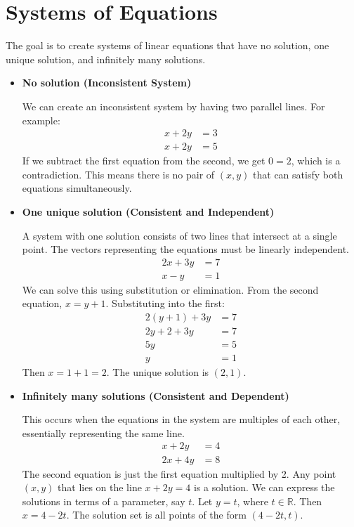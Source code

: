 \documentclass{article}
\begin{document}
\section{Systems of Equations}
    The goal is to create systems of linear equations that have no solution, one unique solution, and infinitely many solutions.
    \begin{itemize}
        \item \textbf{No solution (Inconsistent System)}
        
        We can create an inconsistent system by having two parallel lines. For example:
        \begin{align*}
            x + 2y &= 3 \\
            x + 2y &= 5
        \end{align*}
        If we subtract the first equation from the second, we get $0 = 2$, which is a contradiction. This means there is no pair of $(x, y)$ that can satisfy both equations simultaneously.
        
        \item \textbf{One unique solution (Consistent and Independent)}
        
        A system with one solution consists of two lines that intersect at a single point. The vectors representing the equations must be linearly independent.
        \begin{align*}
            2x + 3y &= 7 \\
            x - y &= 1
        \end{align*}
        We can solve this using substitution or elimination. From the second equation, $x = y + 1$. Substituting into the first:
        \begin{align*}
            2(y+1) + 3y &= 7 \\
            2y + 2 + 3y &= 7 \\
            5y &= 5 \\
            y &= 1
        \end{align*}
        Then $x = 1 + 1 = 2$. The unique solution is $(2, 1)$.
        
        \item \textbf{Infinitely many solutions (Consistent and Dependent)}
        
        This occurs when the equations in the system are multiples of each other, essentially representing the same line.
        \begin{align*}
            x + 2y &= 4 \\
            2x + 4y &= 8
        \end{align*}
        The second equation is just the first equation multiplied by 2. Any point $(x, y)$ that lies on the line $x + 2y = 4$ is a solution. We can express the solutions in terms of a parameter, say $t$. Let $y=t$, where $t \in \mathbb{R}$. Then $x = 4 - 2t$. The solution set is all points of the form $(4 - 2t, t)$.
    \end{itemize}
\end{document}
